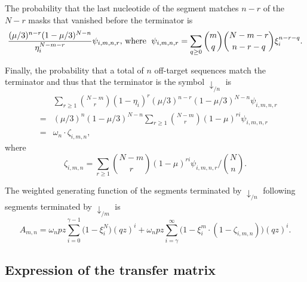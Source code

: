 \documentclass{article}
\begin{document}
The probability that the last nucleotide of the segment matches $n-r$ of
the $N-r$ masks that vanished before the terminator is
\begin{equation*}
\frac{(\mu/3)^{n-r}(1-\mu/3)^{N-n}}{\eta_i^{N-m-r}}
\psi_{i,m,n,r}\text{, where \;}
\psi_{i,m,n,r} = \sum_{q \geq 0}{m \choose q}{N-m-r \choose n-r-q}
\xi_i^{n-r-q}.
\end{equation*}


Finally, the probability that a total of $n$ off-target sequences match
the terminator and thus that the terminator is the symbol
$\downarrow_{/n}$ is
\begin{eqnarray*}
&\;& \sum_{r\geq1} {N-m \choose r}
(1 - \eta_i)^r (\mu/3)^{n-r} (1-\mu/3)^{N-n} \psi_{i,m,n,r} \\
&=& (\mu/3)^n(1-\mu/3)^{N-n} \sum_{r\geq1} {N-m \choose r}
  (1 - \mu)^{ri} \psi_{i,m,n,r} \\
&=& \omega_n \cdot \zeta_{i,m,n},
\end{eqnarray*}
where
\begin{equation}
\label{eq:zeta}
\zeta_{i,m,n} = \sum_{r\geq1} {N-m \choose r}
(1-\mu)^{ri} \psi_{i,m,n,r} \bigg/ {N \choose n}.
\end{equation}


The weighted generating function of the segments terminated by
$\downarrow_{/n}$ following segments terminated by $\downarrow_{/m}$ is
\begin{equation}
\label{eq:A}
A_{m,n} =
\omega_n pz \sum_{i=0}^{\gamma-1} \Big(1 - \xi_i^N \Big) (qz)^i + \omega_n
pz \sum_{i=\gamma}^\infty \Big(1 - \xi_i^m \cdot
(1- \zeta_{i,m,n}) \Big) (qz)^i.
\end{equation}

\subsection{Expression of the transfer matrix}
\label{sec:expression_of_M}
\end{document}
